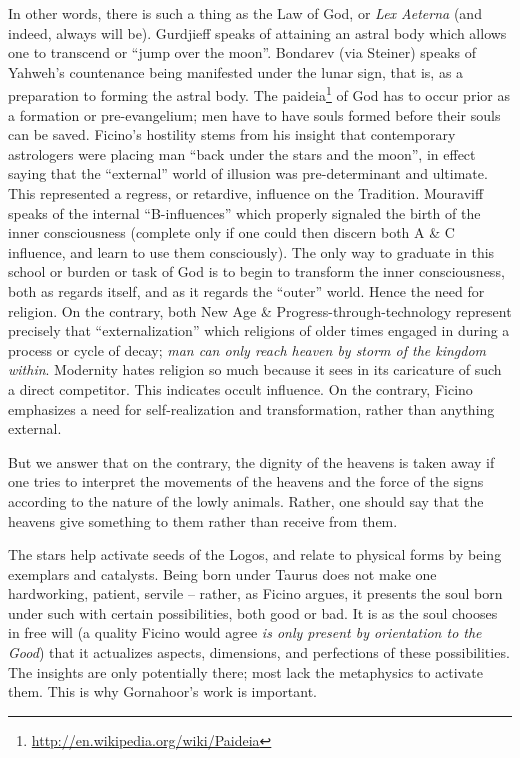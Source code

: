 In other words, there is such a thing as the Law of God, or \emph{Lex Aeterna} (and indeed, always will be). Gurdjieff speaks of attaining an astral body which allows one to transcend or ``jump over the moon''. Bondarev (via Steiner) speaks of Yahweh's countenance being manifested under the lunar sign, that is, as a preparation to forming the astral body. The paideia\footnote{\url{http://en.wikipedia.org/wiki/Paideia}} of God has to occur prior as a formation or pre-evangelium; men have to have souls formed before their souls can be saved. Ficino's hostility stems from his insight that contemporary astrologers were placing man ``back under the stars and the moon'', in effect saying that the ``external'' world of illusion was pre-determinant and ultimate. This represented a regress, or retardive, influence on the Tradition. Mouraviff speaks of the internal ``B-influences'' which properly signaled the birth of the inner consciousness (complete only if one could then discern both A \& C influence, and learn to use them consciously). The only way to graduate in this school or burden or task of God is to begin to transform the inner consciousness, both as regards itself, and as it regards the ``outer'' world. Hence the need for religion. On the contrary, both New Age \& Progress-through-technology represent precisely that ``externalization'' which religions of older times engaged in during a process or cycle of decay; \emph{man can only reach heaven by storm of the kingdom within}. Modernity hates religion so much because it sees in its caricature of such a direct competitor. This indicates occult influence. On the contrary, Ficino emphasizes a need for self-realization and transformation, rather than anything external.

\begin{quotex}
But we answer that on the contrary, the dignity of the heavens is taken away if one tries to interpret the movements of the heavens and the force of the signs according to the nature of the lowly animals. Rather, one should say that the heavens give something to them rather than receive from them.
\end{quotex}


The stars help activate seeds of the Logos, and relate to physical forms by being exemplars and catalysts. Being born under Taurus does not make one hardworking, patient, servile -- rather, as Ficino argues, it presents the soul born under such with certain possibilities, both good or bad. It is as the soul chooses in free will (a quality Ficino would agree \emph{is only present by orientation to the Good}) that it actualizes aspects, dimensions, and perfections of these possibilities. The insights are only potentially there; most lack the metaphysics to activate them. This is why Gornahoor's work is important.

